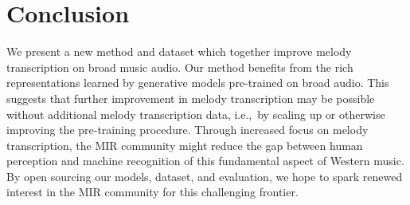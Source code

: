 \section{Conclusion}

We present a new method and dataset which together improve melody transcription on broad music audio. 
Our method benefits from the rich representations learned by generative models pre-trained on broad audio. 
This suggests that further improvement in melody transcription may be possible without additional melody transcription data, i.e.,~by scaling up or otherwise improving the pre-training procedure. 
Through increased focus on melody transcription, the MIR community might reduce the gap between human perception and machine recognition of this fundamental aspect of Western music. 
By open sourcing our models, dataset, and evaluation, we hope to spark renewed interest in the MIR community for this challenging frontier.